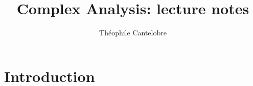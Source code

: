 \documentclass{article}
\title{Complex Analysis: lecture notes}
\author{Th\'eophile Cantelobre}
\begin{document}
\maketitle
\tableofcontents

\newpage
\section*{Introduction}

\newpage

\newpage

\newpage

\newpage

\newpage

\newpage

\newpage

\newpage

\end{document}
